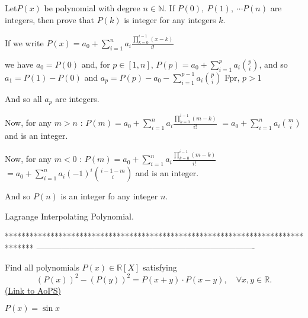 \begin{solution}
	\begin{tcolorbox}Let$ P(x)$ be polynomial with degree $ n\in{\mathbb{N}}$. If $ P(0),\ P(1),\ \cdots P(n)$ are integers, then prove that $ P(k)$ is integer for any integers $ k$.\end{tcolorbox}

If we write $ P(x)=a_0+\sum_{i=1}^na_i\frac{\prod_{k=0}^{i-1}(x-k)}{i!}$

we have $ a_0=P(0)$ and, for $ p\in[1,n]$, $ P(p)=a_0+\sum_{i=1}^{p}a_i\binom{p}{i}$, and so $ a_1=P(1)-P(0)$ and $ a_p=P(p)-a_0-\sum_{i=1}^{p-1}a_i\binom{p}{i}$ Fpr, $ p>1$

And so all $ a_p$ are integers.

Now, for any $ m>n$ : $ P(m)=a_0+\sum_{i=1}^na_i\frac{\prod_{k=0}^{i-1}(m-k)}{i!}$ $ =a_0+\sum_{i=1}^na_i\binom{m}{i}$ and is an integer.

Now, for any $ m<0$ : $ P(m)=a_0+\sum_{i=1}^na_i\frac{\prod_{k=0}^{i-1}(m-k)}{i!}$ $ =a_0+\sum_{i=1}^na_i(-1)^{i}\binom{i-1-m}{i}$ and is an integer.

And so $ P(n)$ is an integer fo any integer $ n$.
\end{solution}



\begin{solution}
	Lagrange Interpolating Polynomial.
\end{solution}
*******************************************************************************
-------------------------------------------------------------------------------

\begin{problem}
	Find all polynomials $ P(x) \in \mathbb{R}[X]$ satisfying 
\[ (P(x))^2-(P(y))^2=P(x+y)\cdot P(x-y) ,\quad  \forall x,y \in \mathbb R.\]
	\flushright \href{https://artofproblemsolving.com/community/c6h180123}{(Link to AoPS)}
\end{problem}



\begin{solution}
	$ P(x)=\sin x$
\end{solution}



